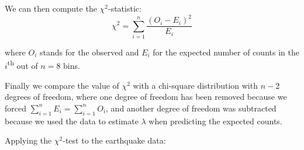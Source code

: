 We can then compute the $\chi^2$-statistic:
\begin{equation}
  \chi^2 = \sum\limits_{i=1}^{n} \frac{(O_i-E_i)^2}{E_i}
  \label{eq:chi2}
\end{equation}

\noindent where $O_i$ stands for the observed and $E_i$ for the
expected number of counts in the $i$\textsuperscript{th} out of $n=8$
bins.\medskip

Finally we compare the value of $\chi^2$ with a chi-square
distribution with $n-2$ degrees of freedom, where one degree of
freedom has been removed because we forced
$\sum_{i=1}^nE_i=\sum_{i=1}^nO_i$, and another degree of freedom was
subtracted because we used the data to estimate $\lambda$ when
predicting the expected counts.\medskip

Applying the $\chi^2$-test to the earthquake data:

